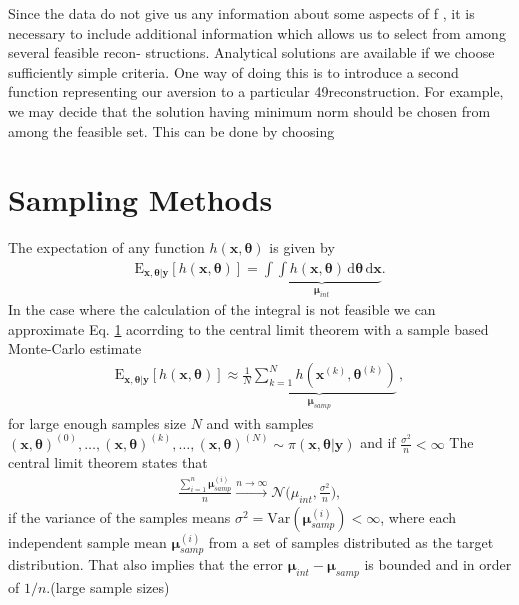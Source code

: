 Since the data do not give us any information about some aspects of f , it is necessary to
include additional information which allows us to select from among several feasible recon-
structions. Analytical solutions are available if we choose sufficiently simple criteria. One way
of doing this is to introduce a second function representing our aversion to a particular
49reconstruction. For example, we may decide that the solution having minimum norm should
be chosen from among the feasible set. This can be done by choosing



\section{Sampling Methods}
The expectation of  any function  $h(\bm{x}, \bm{\theta})$ is given by
\begin{align}
	\label{eq:sampMean}
	\text{E}_{\bm{x},\bm{\theta}|\bm{y}} [h(\bm{x}, \bm{\theta})] = \underbrace{ \int \int h(\bm{x},\bm{\theta}) \, \text{d} \bm{\theta} \, \text{d} \bm{x} }_{\bm{\mu}_{int}} .
\end{align}
In the case where the calculation of the integral is not feasible we can approximate Eq. \ref{} acorrding to the central limit theorem with a sample based Monte-Carlo estimate
\begin{align}
	\label{eq:sampMean}
	\text{E}_{\bm{x},\bm{\theta}|\bm{y}} [h(\bm{x}, \bm{\theta})] \approx \underbrace{ \frac{1}{N} \sum_{k=1}^{N} h(\bm{x}^{(k)},\bm{\theta}^{(k)})  }_{\bm{\mu}_{samp}} \, ,
\end{align}
for large enough samples size $N$ and with samples $ (\bm{x}, \bm{\theta} )^{(0)}, \dots, (\bm{x}, \bm{\theta} )^{(k)} , \dots,  (\bm{x}, \bm{\theta})^{(N)} \sim \pi(\bm{x},\bm{\theta}| \bm{y}) $ and if $ \frac{ \sigma^2 }{n} < \infty$
The central limit theorem states that
\begin{align}
	\frac{\sum_{i = 1}^{n} \bm{\mu}^{(i)}_{samp}}{n} \overset{n \rightarrow \infty}{\longrightarrow} \mathcal{N} \Bigg(\mu_{int}, \frac{ \sigma^2 }{n} \Bigg),
\end{align}
 if the variance of the samples means $\sigma^2 =  \text{Var}(\bm{\mu}^{(i)}_{samp} ) < \infty$, where each independent sample mean  $ \bm{\mu}^{(i)}_{samp} $  from a set of samples distributed as the target distribution.
That also implies that the error $\bm{\mu}_{int} - \bm{\mu}_{samp}$ is bounded  and in order of $1/n$.(large sample sizes)


